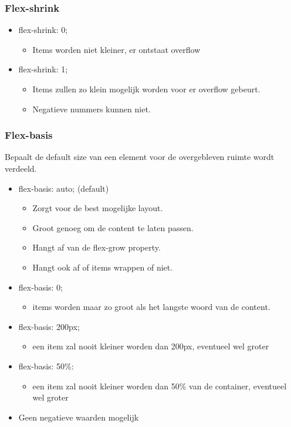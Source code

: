 \documentclass{article}
\begin{document}
\subsubsection{Flex-shrink}

\begin{itemize}
    \item flex-shrink: 0;
    \begin{itemize}
        \item Items worden niet kleiner, er ontstaat overflow
    \end{itemize}
    \item flex-shrink: 1;
    \begin{itemize}
        \item Items zullen zo klein mogelijk worden voor er overflow gebeurt.
        \item Negatieve nummers kunnen niet.
    \end{itemize}
\end{itemize}

\subsubsection{Flex-basis}

Bepaalt de default size van een element voor de overgebleven ruimte wordt verdeeld.

\begin{itemize}
    \item flex-basis: auto; (default)
    \begin{itemize}
        \item Zorgt voor de best mogelijke layout.
        \item Groot genoeg om de content te laten passen.
        \item Hangt af van de flex-grow property.
        \item Hangt ook af of items wrappen of niet.
    \end{itemize}
    \item flex-basis: 0;
    \begin{itemize}
        \item items worden maar zo groot als het langste woord van de content.
    \end{itemize}
    \item flex-basis: 200px;
    \begin{itemize}
        \item een item zal nooit kleiner worden dan 200px, eventueel wel groter
    \end{itemize}
    \item flex-basis: 50\%: 
    \begin{itemize}
        \item een item zal nooit kleiner worden dan 50\% van de container, eventueel wel groter
    \end{itemize}
    \item Geen negatieve waarden mogelijk
\end{itemize}
\end{document}
